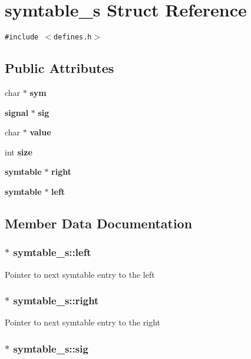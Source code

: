 \section{symtable\_\-s  Struct Reference}
\label{structsymtable__s}
{\tt \#include $<$defines.h$>$}

\subsection*{Public Attributes}
\begin{CompactItemize}
\item 
char $\ast$ {\bf sym}
\item 
{\bf signal} $\ast$ {\bf sig}
\item 
char $\ast$ {\bf value}
\item 
int {\bf size}
\item 
{\bf symtable} $\ast$ {\bf right}
\item 
{\bf symtable} $\ast$ {\bf left}
\end{CompactItemize}


\subsection{Member Data Documentation}
\subsubsection{$\ast$ symtable\_\-s::left}\label{structsymtable__s_m5}


Pointer to next symtable entry to the left 
\subsubsection{$\ast$ symtable\_\-s::right}\label{structsymtable__s_m4}


Pointer to next symtable entry to the right 
\subsubsection{$\ast$ symtable\_\-s::sig}\label{structsymtable__s_m1}


